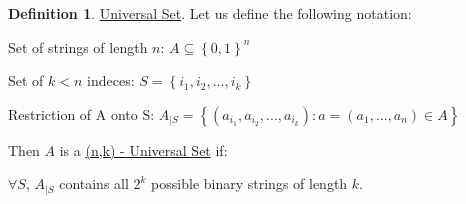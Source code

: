 \documentclass[psamsfonts, 12pt]{amsart}
\theoremstyle{definition}
\newtheorem{defn}[thm]{Definition}
\theoremstyle{remark}
\begin{document}
\vspace{1em}

\begin{defn}
\underline{Universal Set}. Let us define the following notation:

\begin{center}
Set of strings of length $n$: $A \subseteq \left\lbrace 0,1 \right\rbrace^n$
\end{center}

\begin{center}
Set of $k < n$ indeces: $S = \left\lbrace i_1,i_2,...,i_k \right\rbrace$
\end{center}


\begin{center}
Restriction of A onto S: $A_{|S} = \left\lbrace (a_{i_1},a_{i_2},...,a_{i_k}) : a = (a_1,...,a_n) \in A \right\rbrace$
\end{center}

Then $A$ is a \underline{(n,k) - Universal Set} if:

\begin{center}
$\forall S$, $A_{|S}$ contains all $2^k$ possible binary strings of length $k$.
\end{center}
\end{defn}
\end{document}
